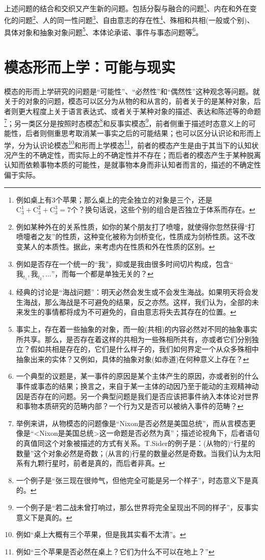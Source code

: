 \documentclass{article}
\begin{document}
上述问题的结合和交织又产生新的问题。包括分裂与融合的问题\footnote{例如桌上有3个苹果；那么桌上的完全独立的对象是三个，还是$\mathrm{C_3^1+C_3^2+C_3^3=7}$个？换句话说，这些个别的组合是否独立于体系而存在。}、内在和外在变化的问题\footnote{例如某种外在的关系性质，如你的某个朋友打了喷嚏，就使得你忽然获得“打喷嚏者之友”的性质，这种变化被称为剑桥变化，性质成为剑桥性质。这不改变某人的本质性。据此，来考虑内在性质和外在性质的区别。}、人的同一性问题\footnote{例如是否存在一个统一的“我”，抑或是我由很多时间切片构成，包含“$\text{我}_{t_1},\text{我}_{t_2},...$”，而每一个都是单独无关的？}、自由意志的存在性\footnote{经典的讨论是“海战问题”：明天必然会发生或不会发生海战。如果明天将会发生海战，那么海战是不可避免的结果，反之亦然。这样，我们认为，全部的未来发生的事情都将成为不可避免的，自由意志将失去其存在的位置。}、殊相和共相(一般或个别)、具体对象和抽象对象问题\footnote{事实上，存在着一些抽象的对象，而一般(共相)的内容必然对不同的抽象事实所共享。那么，是否存在着这样的共相为一些殊相所共有，亦或者它们分别独立？假如共相是存在的，它们是什么样子的，我们如何界定一个从众多殊相中抽象出来的实体？又例如，具体的抽象对象(如赤道)在何种意义上存在？}、本体论承诺、事件与事态问题等\footnote{一个典型的议题是，某一事件的原因是某个主体产生的原因，亦或者别的什么事件或事态的结果；换言之，来自于某一主体的动因乃至于能动的主观精神动因是否存在的问题。另一个典型问题是我们是否应该把事件纳入本体论对世界和事物本质研究的范畴内部？一个行为又是否可以被纳入事件的范畴？}。
\section{模态形而上学：可能与现实}
模态的形而上学研究的问题是“可能性”、“必然性”和“偶然性”这种观念等问题。就关于的对象的问题，模态可以区分为从物的和从言的，前者关于的是某种对象，后者则更大程度上关于语言表达式、或者关于某种对象的描述、表达和陈述等的命题\footnote{举例来讲，从物模态的问题像是“Nixon是否必然是美国总统”，而从言模态更像是“<Nixon是美国总统>这一命题是否必然为真”；描述论视角下，后者语句的真值同这个对象被描述的方式有关系。T.Sider的例子是：(从物的)“行星的数量”这个对象必然是奇数；(从言的)行星的数量必然是奇数。当我们认为太阳系有九颗行星时，前者是真的，而后者非真。}；另一类区分是按照时态模态\footnote{一个例子是“张三现在很帅气，但他完全可能是另一个样子”，时态意义下是真的。}和反事实模态\footnote{一个例子是“若二战未曾打响过，那么世界将完全呈现出不同的样子”，反事实意义下是真的。}，前者侧重于描述时态意义上的可能性，后者则侧重思考取消某一事实之后的可能结果；也可以区分认识论和形而上学，分为认识论模态\footnote{例如“桌上大概有三个苹果，但是我其实看不太清”。}和形而上学模态\footnote{例如“三个苹果是否必然在桌上？它们为什么不可以在地上？”}，前者的模态产生是由于其当下的认知状况产生的不确定性，而实际上的不确定性并不存在；而后者的模态产生于某种脱离认知而依赖事物本质的可能性，是就事物本身而非认知者而言的，描述的不确定性偏于实际。
\end{document}
